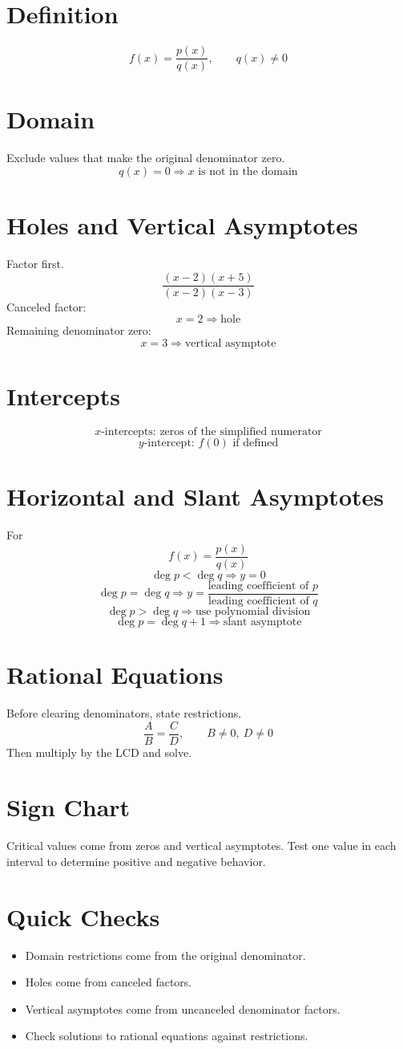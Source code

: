 \documentclass[11pt]{article}
\begin{document}

\section*{Definition}
\[
f(x)=\frac{p(x)}{q(x)},\qquad q(x)\ne0
\]

\section*{Domain}
Exclude values that make the original denominator zero.
\[
q(x)=0\Rightarrow x\text{ is not in the domain}
\]

\section*{Holes and Vertical Asymptotes}
Factor first.
\[
\frac{(x-2)(x+5)}{(x-2)(x-3)}
\]
Canceled factor:
\[
x=2\Rightarrow \text{hole}
\]
Remaining denominator zero:
\[
x=3\Rightarrow \text{vertical asymptote}
\]

\section*{Intercepts}
\[
x\text{-intercepts: zeros of the simplified numerator}
\]
\[
y\text{-intercept: }f(0)\text{ if defined}
\]

\section*{Horizontal and Slant Asymptotes}
For
\[
f(x)=\frac{p(x)}{q(x)}
\]
\[
\deg p<\deg q\Rightarrow y=0
\]
\[
\deg p=\deg q\Rightarrow y=\frac{\text{leading coefficient of }p}{\text{leading coefficient of }q}
\]
\[
\deg p>\deg q\Rightarrow \text{use polynomial division}
\]
\[
\deg p=\deg q+1\Rightarrow \text{slant asymptote}
\]

\section*{Rational Equations}
Before clearing denominators, state restrictions.
\[
\frac{A}{B}=\frac{C}{D},\qquad B\ne0,\ D\ne0
\]
Then multiply by the LCD and solve.

\section*{Sign Chart}
Critical values come from zeros and vertical asymptotes. Test one value in each interval to determine positive and negative behavior.

\section*{Quick Checks}
\begin{itemize}
  \item Domain restrictions come from the original denominator.
  \item Holes come from canceled factors.
  \item Vertical asymptotes come from uncanceled denominator factors.
  \item Check solutions to rational equations against restrictions.
\end{itemize}
\end{document}
